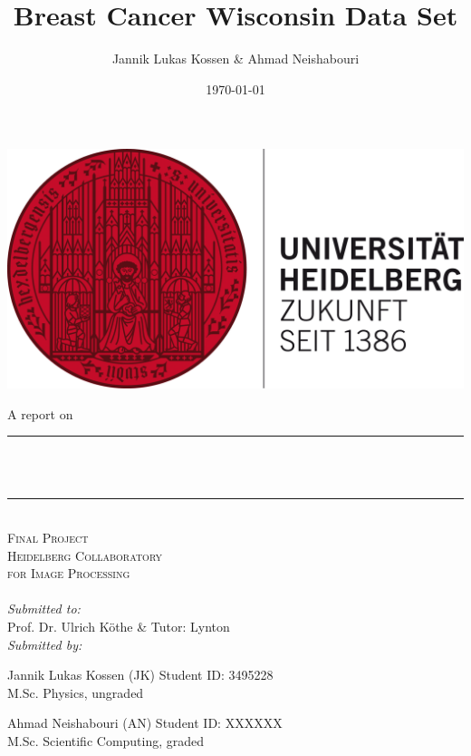 \documentclass[12pt, a4paper]{scrartcl}
\title{Breast Cancer Wisconsin Data Set} %
\author{Jannik Lukas Kossen \& Ahmad Neishabouri}                               %
\date{\today}                                         %
\makeatletter
\let\thetitle\@title
\let\thedate\@date
\makeatother
\begin{document}

\begin{titlepage}
    \centering
    \includegraphics[scale = 0.6]{hdlogo}\\[2.0 cm]  %
     \begin{flushleft}
     \large  \hspace{1cm} A report on 
	\end{flushleft}      
     \centering
    \rule{\linewidth}{0.2 mm} \\[0.4 cm]
    { \huge \bfseries \thetitle}\\
    \rule{\linewidth}{0.2 mm} \\[1.5 cm]
    
    \textsc{\LARGE Final Project}\\[0.5 cm]               %
    \textsc{\Large Heidelberg Collaboratory \\[0.5em] for Image Processing}\\[2.0 cm]  %
    \thedate
   	\\[3em]
    \large
            \emph{Submitted to:}\\[1em]
            Prof. Dr. Ulrich Köthe \& Tutor: Lynton\\[1cm]
            \emph{Submitted by:} \\[1.5em]
            \begin{minipage}{0.4\textwidth}            
            	\begin{flushleft} 
					\large Jannik Lukas Kossen (JK) Student ID: 3495228 \\
					\small M.Sc. Physics, ungraded\\
      		  \end{flushleft}
      		 \end{minipage}
            \begin{minipage}{0.4\textwidth}            
            	\begin{flushright} 
    	    	    \large Ahmad Neishabouri (AN) Student ID: XXXXXX \\ 
         	   		\small M.Sc. Scientific Computing, graded
      		  \end{flushright}
      		 \end{minipage}\\[2 cm]


        
 
\end{titlepage}
\end{document}

